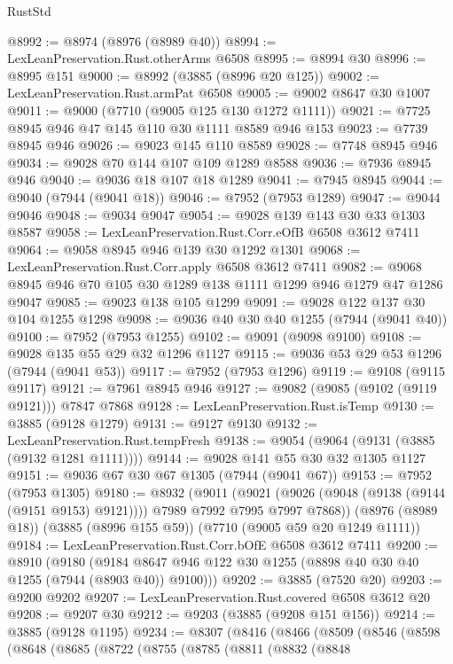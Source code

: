 \begin{lexlean}{RustStd}
\begin{coremodule}
@8992 := @8974 (@8976 (@8989 @40))
@8994 := LexLeanPreservation.Rust.otherArms @6508
@8995 := @8994 @30
@8996 := @8995 @151
@9000 := @8992 (@3885 (@8996 @20 @125))
@9002 := LexLeanPreservation.Rust.armPat @6508
@9005 := @9002 @8647 @30 @1007
@9011 := @9000 (@7710 (@9005 @125 @130 @1272 @1111))
@9021 := @7725 @8945 @946 @47 @145 @110 @30 @1111 @8589 @946 @153
@9023 := @7739 @8945 @946
@9026 := @9023 @145 @110 @8589
@9028 := @7748 @8945 @946
@9034 := @9028 @70 @144 @107 @109 @1289 @8588
@9036 := @7936 @8945 @946
@9040 := @9036 @18 @107 @18 @1289
@9041 := @7945 @8945
@9044 := @9040 (@7944 (@9041 @18))
@9046 := @7952 (@7953 @1289)
@9047 := @9044 @9046
@9048 := @9034 @9047
@9054 := @9028 @139 @143 @30 @33 @1303 @8587
@9058 := LexLeanPreservation.Rust.Corr.eOfB @6508 @3612 @7411
@9064 := @9058 @8945 @946 @139 @30 @1292 @1301
@9068 := LexLeanPreservation.Rust.Corr.apply @6508 @3612 @7411
@9082 := @9068 @8945 @946 @70 @105 @30 @1289 @138 @1111 @1299 @946 @1279 @47 @1286 @9047
@9085 := @9023 @138 @105 @1299
@9091 := @9028 @122 @137 @30 @104 @1255 @1298
@9098 := @9036 @40 @30 @40 @1255 (@7944 (@9041 @40))
@9100 := @7952 (@7953 @1255)
@9102 := @9091 (@9098 @9100)
@9108 := @9028 @135 @55 @29 @32 @1296 @1127
@9115 := @9036 @53 @29 @53 @1296 (@7944 (@9041 @53))
@9117 := @7952 (@7953 @1296)
@9119 := @9108 (@9115 @9117)
@9121 := @7961 @8945 @946
@9127 := @9082 (@9085 (@9102 (@9119 @9121))) @7847 @7868
@9128 := LexLeanPreservation.Rust.isTemp
@9130 := @3885 (@9128 @1279)
@9131 := @9127 @9130
@9132 := LexLeanPreservation.Rust.tempFresh
@9138 := @9054 (@9064 (@9131 (@3885 (@9132 @1281 @1111))))
@9144 := @9028 @141 @55 @30 @32 @1305 @1127
@9151 := @9036 @67 @30 @67 @1305 (@7944 (@9041 @67))
@9153 := @7952 (@7953 @1305)
@9180 := @8932
    (@9011
      (@9021 (@9026 (@9048 (@9138 (@9144 (@9151 @9153) @9121)))) @7989 @7992 @7995 @7997 @7868))
    (@8976 (@8989 @18))
    (@3885 (@8996 @155 @59))
    (@7710 (@9005 @59 @20 @1249 @1111))
@9184 := LexLeanPreservation.Rust.Corr.bOfE @6508 @3612 @7411
@9200 := @8910
    (@9180 (@9184 @8647 @946 @122 @30 @1255 (@8898 @40 @30 @40 @1255 (@7944 (@8903 @40)) @9100)))
@9202 := @3885 (@7520 @20)
@9203 := @9200 @9202
@9207 := LexLeanPreservation.Rust.covered @6508 @3612 @20
@9208 := @9207 @30
@9212 := @9203 (@3885 (@9208 @151 @156))
@9214 := @3885 (@9128 @1195)
@9234 := @8307
    (@8416
      (@8466
        (@8509
          (@8546
            (@8598
              (@8648
                (@8685
                  (@8722
                    (@8755
                      (@8785
                        (@8811
                          (@8832
                            (@8848

\end{coremodule}
\end{lexlean}
